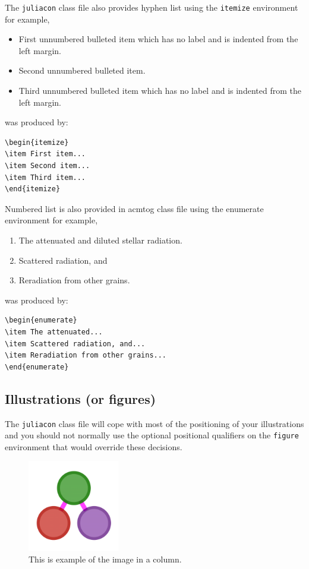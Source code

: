 \documentclass{juliacon}
\begin{document}
The \verb|juliacon|  class file also provides hyphen list using the
\verb|itemize|  environment for example,
\begin{itemize}
\item First unnumbered bulleted item which has no label and is indented
from the left margin.
\item Second unnumbered bulleted item.
\item Third unnumbered bulleted item which has no label and is indented
from the left margin.
\end{itemize}
was produced by:
\begin{verbatim}
\begin{itemize}
\item First item...
\item Second item...
\item Third item...
\end{itemize}
\end{verbatim}

Numbered list is also provided in acmtog class file using the
enumerate environment for example,
\begin{enumerate}
\item The attenuated and diluted stellar radiation.
\item Scattered radiation, and
\item Reradiation from other grains.
\end{enumerate}

was produced by:
\begin{verbatim}
\begin{enumerate}
\item The attenuated...
\item Scattered radiation, and...
\item Reradiation from other grains...
\end{enumerate}
\end{verbatim}
\subsection{Illustrations (or figures)}
\label{subsub:sec_Illus}
The \verb|juliacon|  class file will cope with most of the positioning of
your illustrations and you should not normally use the optional positional
qualifiers on the \verb|figure|  environment that would override
these decisions.
\vskip 6pt

%
\begin{figure}[t]
\centerline{\includegraphics[width=4cm]{juliagraphs.png}}
\caption{This is example of the image in a column.}
	\label{fig:sample_figure}
\end{figure}
\end{document}
